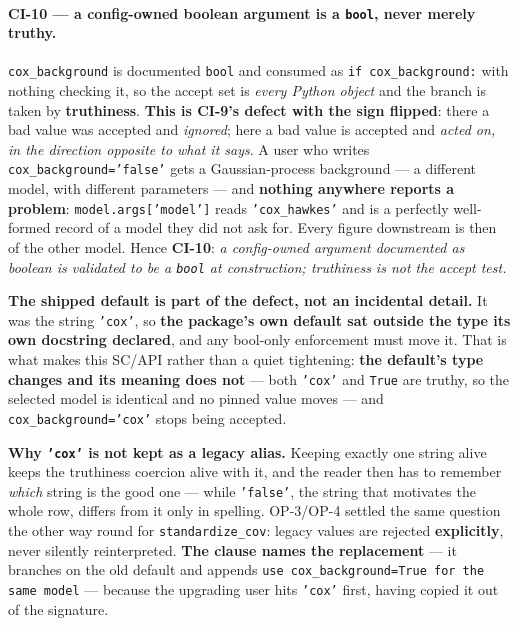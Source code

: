\documentclass[
  10pt,
]{article}
\begin{document}
\paragraph{CI-10 --- a config-owned boolean argument is a \texttt{bool}, never merely truthy.}
\texttt{cox\_background} is documented \texttt{bool} and consumed as \texttt{if cox\_background:} with nothing checking it, so the accept set is \emph{every Python object} and the branch is taken by \textbf{truthiness}. \textbf{This is CI-9's defect with the sign flipped}: there a bad value was accepted and \emph{ignored}; here a bad value is accepted and \emph{acted on, in the direction opposite to what it says}. A user who writes \texttt{cox\_background='false'} gets a Gaussian-process background --- a different model, with different parameters --- and \textbf{nothing anywhere reports a problem}: \texttt{model.args['model']} reads \texttt{'cox\_hawkes'} and is a perfectly well-formed record of a model they did not ask for. Every figure downstream is then of the other model. Hence \textbf{CI-10}: \emph{a config-owned argument documented as boolean is validated to be a \texttt{bool} at construction; truthiness is not the accept test.}

\textbf{The shipped default is part of the defect, not an incidental detail.} It was the string \texttt{'cox'}, so \textbf{the package's own default sat outside the type its own docstring declared}, and any bool-only enforcement must move it. That is what makes this SC/API rather than a quiet tightening: \textbf{the default's type changes and its meaning does not} --- both \texttt{'cox'} and \texttt{True} are truthy, so the selected model is identical and no pinned value moves --- and \texttt{cox\_background='cox'} stops being accepted.

\textbf{Why \texttt{'cox'} is not kept as a legacy alias.} Keeping exactly one string alive keeps the truthiness coercion alive with it, and the reader then has to remember \emph{which} string is the good one --- while \texttt{'false'}, the string that motivates the whole row, differs from it only in spelling. OP-3/OP-4 settled the same question the other way round for \texttt{standardize\_cov}: legacy values are rejected \textbf{explicitly}, never silently reinterpreted. \textbf{The clause names the replacement} --- it branches on the old default and appends \texttt{use cox\_background=True for the same model} --- because the upgrading user hits \texttt{'cox'} first, having copied it out of the signature.
\end{document}
